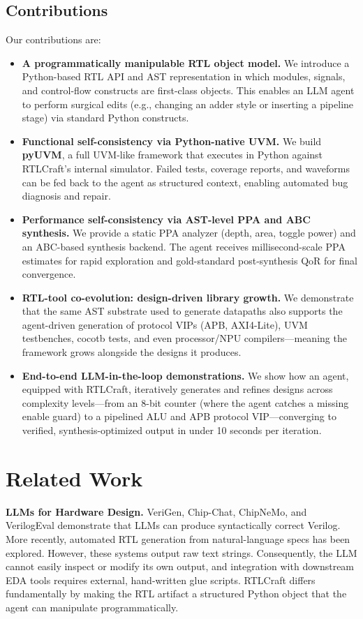 \documentclass[11pt]{article}
\begin{document}
\subsection{Contributions}

Our contributions are:
\begin{itemize}
    \item \textbf{A programmatically manipulable RTL object model.} We introduce a Python-based RTL API and AST representation in which modules, signals, and control-flow constructs are first-class objects. This enables an LLM agent to perform surgical edits (e.g., changing an adder style or inserting a pipeline stage) via standard Python constructs.
    \item \textbf{Functional self-consistency via Python-native UVM.} We build \textbf{pyUVM}, a full UVM-like framework that executes in Python against RTLCraft's internal simulator. Failed tests, coverage reports, and waveforms can be fed back to the agent as structured context, enabling automated bug diagnosis and repair.
    \item \textbf{Performance self-consistency via AST-level PPA and ABC synthesis.} We provide a static PPA analyzer (depth, area, toggle power) and an ABC-based synthesis backend. The agent receives millisecond-scale PPA estimates for rapid exploration and gold-standard post-synthesis QoR for final convergence.
    \item \textbf{RTL-tool co-evolution: design-driven library growth.} We demonstrate that the same AST substrate used to generate datapaths also supports the agent-driven generation of protocol VIPs (APB, AXI4-Lite), UVM testbenches, cocotb tests, and even processor/NPU compilers---meaning the framework grows alongside the designs it produces.
    \item \textbf{End-to-end LLM-in-the-loop demonstrations.} We show how an agent, equipped with RTLCraft, iteratively generates and refines designs across complexity levels---from an 8-bit counter (where the agent catches a missing enable guard) to a pipelined ALU and APB protocol VIP---converging to verified, synthesis-optimized output in under 10 seconds per iteration.
\end{itemize}

\section{Related Work}
\label{sec:related}

\textbf{LLMs for Hardware Design.} VeriGen\cite{thakur2023verigen}, Chip-Chat\cite{blocklove2023chipchat}, ChipNeMo\cite{kim2023chipnemo}, and VerilogEval\cite{fathian2024verilogeval} demonstrate that LLMs can produce syntactically correct Verilog. More recently, automated RTL generation from natural-language specs has been explored\cite{tsai2023verilogagent,chisellm2024}. However, these systems output raw text strings. Consequently, the LLM cannot easily inspect or modify its own output, and integration with downstream EDA tools requires external, hand-written glue scripts. RTLCraft differs fundamentally by making the RTL artifact a structured Python object that the agent can manipulate programmatically.
\end{document}
